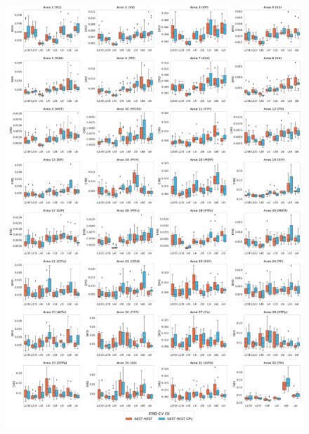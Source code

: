 \documentclass[a4paper, 12pt, twoside, openright]{book}
\begin{document}
\begin{figure}[H]
    \centering
    \includegraphics[width=\columnwidth]{figures/emd_boxplot_vert_gs_CV_ISI.pdf}
\end{figure}
\end{document}
